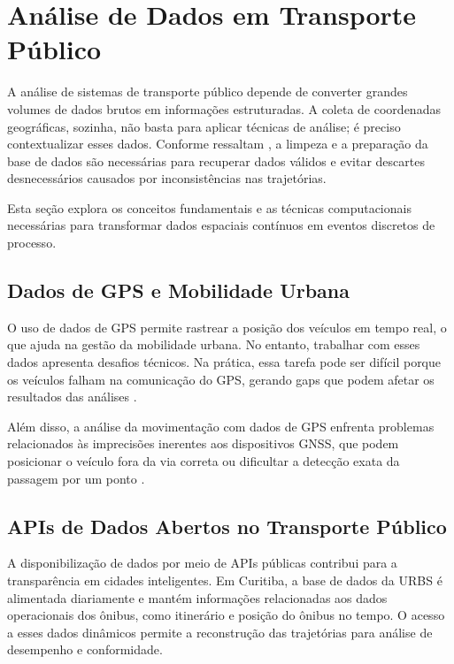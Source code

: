 \section{Análise de Dados em Transporte Público}\label{sec:analiseTransporte}

A análise de sistemas de transporte público depende de converter grandes volumes de dados brutos em informações estruturadas. A coleta de coordenadas geográficas, sozinha, não basta para aplicar técnicas de análise; é preciso contextualizar esses dados. Conforme ressaltam , a limpeza e a preparação da base de dados são necessárias para recuperar dados válidos e evitar descartes desnecessários causados por inconsistências nas trajetórias.

Esta seção explora os conceitos fundamentais e as técnicas computacionais necessárias para transformar dados espaciais contínuos em eventos discretos de processo.

\subsection{Dados de GPS e Mobilidade Urbana}\label{subsec:gpsMobilidade}

O uso de dados de GPS permite rastrear a posição dos veículos em tempo real, o que ajuda na gestão da mobilidade urbana. No entanto, trabalhar com esses dados apresenta desafios técnicos. Na prática, essa tarefa pode ser difícil porque os veículos falham na comunicação do GPS, gerando gaps que podem afetar os resultados das análises \cite{borges2023}.

Além disso, a análise da movimentação com dados de GPS enfrenta problemas relacionados às imprecisões inerentes aos dispositivos GNSS, que podem posicionar o veículo fora da via correta ou dificultar a detecção exata da passagem por um ponto \cite{martins2022}.

\subsection{APIs de Dados Abertos no Transporte Público}\label{subsec:apis}

A disponibilização de dados por meio de APIs públicas contribui para a transparência em cidades inteligentes. Em Curitiba, a base de dados da URBS \cite{urbs2024} é alimentada diariamente e mantém informações relacionadas aos dados operacionais dos ônibus, como itinerário e posição do ônibus no tempo. O acesso a esses dados dinâmicos permite a reconstrução das trajetórias para análise de desempenho e conformidade.

